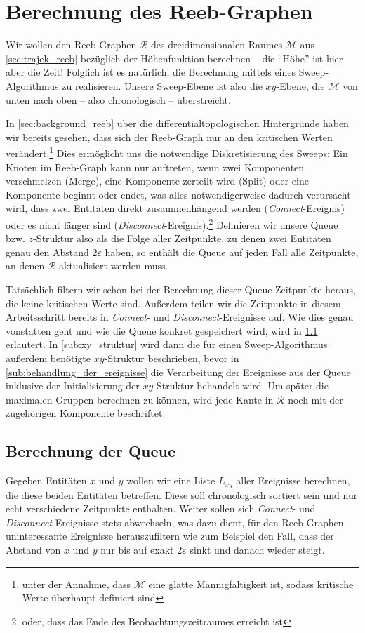 \section{Berechnung des Reeb-Graphen} %
\label{sec:berechnung_reeb}
Wir wollen den Reeb-Graphen $\mathcal{R}$ des dreidimensionalen Raumes $\mathcal{M}$ aus \cref{sec:trajek_reeb} bezüglich der Höhenfunktion berechnen -- die \enquote{Höhe} ist hier aber die Zeit!
Folglich ist es natürlich, die Berechnung mittels eines Sweep-Algorithmus zu realisieren.
Unsere Sweep-Ebene ist also die $xy$-Ebene, die $\mathcal{M}$ von unten nach oben -- also chronologisch -- überstreicht.

In \cref{sec:background_reeb} über die differentialtopologischen Hintergründe haben wir bereits gesehen, dass sich der Reeb-Graph nur an den kritischen Werten verändert.\footnote{unter der Annahme, dass $\mathcal{M}$ eine glatte Mannigfaltigkeit ist, sodass kritische Werte überhaupt definiert sind}
Dies ermöglicht uns die notwendige Diskretisierung des Sweeps: Ein Knoten im Reeb-Graph kann nur auftreten, wenn zwei Komponenten verschmelzen (Merge), eine Komponente zerteilt wird (Split) oder eine Komponente beginnt oder endet, was alles notwendigerweise dadurch verursacht wird, dass zwei Entitäten direkt zusammenhängend werden (\emph{Connect}-Ereignis) oder es nicht länger sind (\emph{Disconnect}-Ereignis).\footnote{oder, dass das Ende des Beobachtungszeitraumes erreicht ist}
Definieren wir unsere Queue bzw. $z$-Struktur also als die Folge aller Zeitpunkte, zu denen zwei Entitäten genau den Abstand $2 \varepsilon$ haben, so enthält die Queue auf jeden Fall alle Zeitpunkte, an denen $\mathcal{R}$ aktualisiert werden muss.

Tatsächlich filtern wir schon bei der Berechnung dieser Queue Zeitpunkte heraus, die keine kritischen Werte sind.
Außerdem teilen wir die Zeitpunkte in diesem Arbeitsschritt bereits in \emph{Connect}- und \emph{Disconnect}-Ereignisse auf.
Wie dies genau vonstatten geht und wie die Queue konkret gespeichert wird, wird in \cref{sub:berechnung_queue} erläutert.
In \cref{sub:xy_struktur} wird dann die für einen Sweep-Algorithmus außerdem benötigte $xy$-Struktur beschrieben, bevor in \cref{sub:behandlung_der_ereignisse} die Verarbeitung der Ereignisse aus der Queue inklusive der Initialisierung der $xy$-Struktur behandelt wird.
Um später die maximalen Gruppen berechnen zu können, wird jede Kante in $\mathcal{R}$ noch mit der zugehörigen Komponente beschriftet.

\subsection{Berechnung der Queue} %
\label{sub:berechnung_queue}
Gegeben Entitäten $x$ und $y$ wollen wir eine Liste $L_{xy}$ aller Ereignisse berechnen, die diese beiden Entitäten betreffen.
Diese soll chronologisch sortiert sein und nur echt verschiedene Zeitpunkte enthalten.
Weiter sollen sich \emph{Connect}- und \emph{Disconnect}-Ereignisse stets abwechseln, was dazu dient, für den Reeb-Graphen uninteressante Ereignisse herauszufiltern wie zum Beispiel den Fall, dass der Abstand von $x$ und $y$ nur bis auf exakt $2 \varepsilon$ sinkt und danach wieder steigt.

